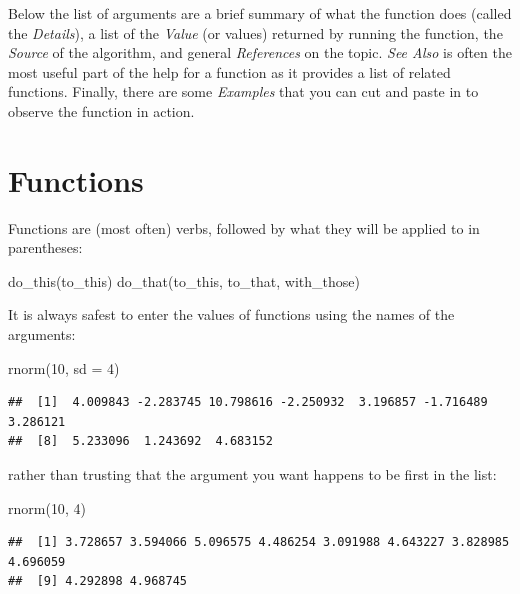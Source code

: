 \documentclass[
]{book}
\newenvironment{Shaded}{\begin{snugshade}}{\end{snugshade}}
\newcommand{\AttributeTok}[1]{\textcolor[rgb]{0.77,0.63,0.00}{#1}}
\newcommand{\DecValTok}[1]{\textcolor[rgb]{0.00,0.00,0.81}{#1}}
\newcommand{\FunctionTok}[1]{\textcolor[rgb]{0.00,0.00,0.00}{#1}}
\newcommand{\NormalTok}[1]{#1}
\begin{document}
Below the list of arguments are a brief summary of what the function does (called the \emph{Details}), a list of the \emph{Value} (or values) returned by running the function, the \emph{Source} of the algorithm, and general \emph{References} on the topic. \emph{See Also} is often the most useful part of the help for a function as it provides a list of related functions. Finally, there are some \emph{Examples} that you can cut and paste in to observe the function in action.

\hypertarget{functions}{%
\section{Functions}\label{functions}}

Functions are (most often) verbs, followed by what they will be applied to in parentheses:

\begin{Shaded}
\begin{Highlighting}[]
\FunctionTok{do\_this}\NormalTok{(to\_this)}
\FunctionTok{do\_that}\NormalTok{(to\_this, to\_that, with\_those)}
\end{Highlighting}
\end{Shaded}

It is always safest to enter the values of functions using the names of the arguments:

\begin{Shaded}
\begin{Highlighting}[]
\FunctionTok{rnorm}\NormalTok{(}\DecValTok{10}\NormalTok{, }\AttributeTok{sd =} \DecValTok{4}\NormalTok{)}
\end{Highlighting}
\end{Shaded}

\begin{verbatim}
##  [1]  4.009843 -2.283745 10.798616 -2.250932  3.196857 -1.716489  3.286121
##  [8]  5.233096  1.243692  4.683152
\end{verbatim}

rather than trusting that the argument you want happens to be first in the list:

\begin{Shaded}
\begin{Highlighting}[]
\FunctionTok{rnorm}\NormalTok{(}\DecValTok{10}\NormalTok{, }\DecValTok{4}\NormalTok{)}
\end{Highlighting}
\end{Shaded}

\begin{verbatim}
##  [1] 3.728657 3.594066 5.096575 4.486254 3.091988 4.643227 3.828985 4.696059
##  [9] 4.292898 4.968745
\end{verbatim}
\end{document}
